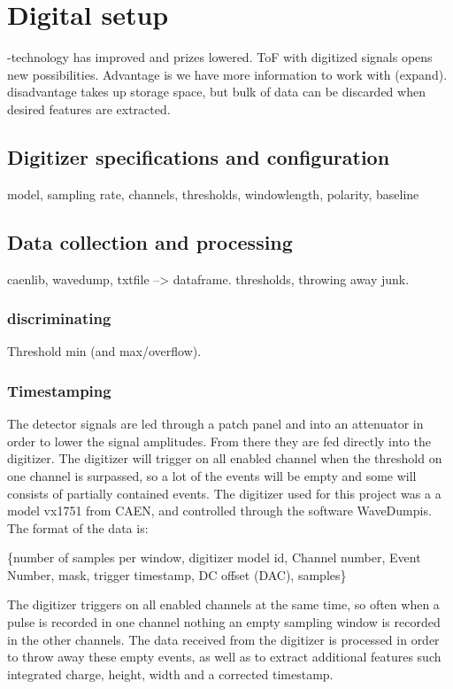 \documentclass[main.tex]{subfiles}
\begin{document}
\section{Digital setup}
-technology has improved and prizes lowered. ToF with digitized signals opens new possibilities. Advantage is we have more information to work with (expand). disadvantage takes up storage space, but bulk of data can be discarded when desired features are extracted.
\subsection{Digitizer specifications and configuration}
model, sampling rate, channels, thresholds, windowlength, polarity, baseline
\subsection{Data collection and processing}
caenlib, wavedump, txtfile --> dataframe. thresholds, throwing away junk.
\subsubsection{discriminating}
Threshold min (and max/overflow).

\subsubsection{Timestamping}
The detector signals are led through a patch panel and into an attenuator in order to lower the signal amplitudes. From there they are fed directly into the digitizer. The digitizer will trigger on all enabled channel when the threshold on one channel is surpassed, so a lot of the events will be empty and some will consists of partially contained events. The digitizer used for this project was a a model vx1751 from CAEN, and controlled through the software WaveDumpis. The format of the data is:

\{number of samples per window, digitizer model id, Channel number, Event Number, mask, trigger timestamp, DC offset (DAC), samples\}


The digitizer triggers on all enabled channels at the same time, so often when a pulse is recorded in one channel nothing an empty sampling window is recorded in the other channels. The data received from the digitizer is processed in order to throw away these empty events, as well as to extract additional features such integrated charge, height, width and a corrected timestamp.
\end{document}
